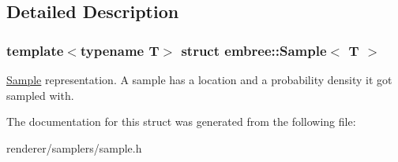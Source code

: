 \subsection{Detailed Description}
\subsubsection*{template$<$typename T$>$ struct embree::Sample$<$ T $>$}

\hyperlink{structembree_1_1_sample}{Sample} representation. A sample has a location and a probability density it got sampled with. 

The documentation for this struct was generated from the following file:\begin{DoxyCompactItemize}
\item 
renderer/samplers/sample.h\end{DoxyCompactItemize}
